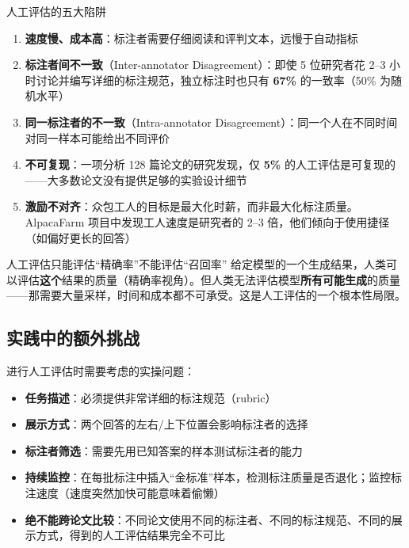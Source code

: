 \documentclass[a4paper]{article}
\begin{document}



\begin{warningbox}{人工评估的五大陷阱}
\begin{enumerate}
    \item \textbf{速度慢、成本高}：标注者需要仔细阅读和评判文本，远慢于自动指标
    \item \textbf{标注者间不一致}（Inter-annotator Disagreement）：即使 5 位研究者花 2--3 小时讨论并编写详细的标注规范，独立标注时也只有 \textbf{67\%} 的一致率（50\% 为随机水平）
    \item \textbf{同一标注者的不一致}（Intra-annotator Disagreement）：同一个人在不同时间对同一样本可能给出不同评价
    \item \textbf{不可复现}：一项分析 128 篇论文的研究发现，仅 \textbf{5\%} 的人工评估是可复现的——大多数论文没有提供足够的实验设计细节
    \item \textbf{激励不对齐}：众包工人的目标是最大化时薪，而非最大化标注质量。AlpacaFarm 项目中发现工人速度是研究者的 2--3 倍，他们倾向于使用捷径（如偏好更长的回答）
\end{enumerate}
\end{warningbox}

\begin{knowledgebox}{人工评估只能评估``精确率''不能评估``召回率''}
给定模型的一个生成结果，人类可以评估\textbf{这个}结果的质量（精确率视角）。但人类无法评估模型\textbf{所有可能生成}的质量——那需要大量采样，时间和成本都不可承受。这是人工评估的一个根本性局限。
\end{knowledgebox}

\subsection{实践中的额外挑战}

进行人工评估时需要考虑的实操问题：

\begin{itemize}
    \item \textbf{任务描述}：必须提供非常详细的标注规范（rubric）
    \item \textbf{展示方式}：两个回答的左右/上下位置会影响标注者的选择
    \item \textbf{标注者筛选}：需要先用已知答案的样本测试标注者的能力
    \item \textbf{持续监控}：在每批标注中插入``金标准''样本，检测标注质量是否退化；监控标注速度（速度突然加快可能意味着偷懒）
    \item \textbf{绝不能跨论文比较}：不同论文使用不同的标注者、不同的标注规范、不同的展示方式，得到的人工评估结果完全不可比
\end{itemize}
\end{document}
